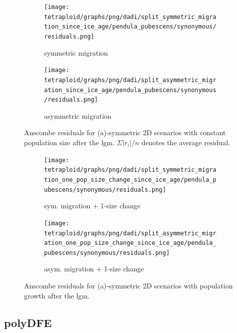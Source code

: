 \documentclass[hidelinks,11pt]{article}
\begin{document}
    \begin{figure}[H]
        \centering
        \begin{subfigure}[b]{0.49\textwidth}
            \texttt{[image: tetraploid/graphs/png/dadi/split\_symmetric\_migration\_since\_ice\_age/pendula\_pubescens/synonymous/residuals.png]}
            \caption{symmetric migration}
            \label{fig:constant_pop_size}
        \end{subfigure}
        \hfill
        \begin{subfigure}[b]{0.49\textwidth}
            \texttt{[image: tetraploid/graphs/png/dadi/split\_asymmetric\_migration\_since\_ice\_age/pendula\_pubescens/synonymous/residuals.png]}
            \caption{asymmetric migration}
            \label{fig:one_pop_size_change}
        \end{subfigure}
        \caption{Anscombe residuals for (a)-symmetric 2D scenarios with constant population size after the \acrshort{lgm}. $\Sigma |r_i|/n$ denotes the average residual.}
        \label{fig:dadi_2d_residuals_constant_size_fixed_time}
    \end{figure}

    \begin{figure}[H]
        \centering
        \begin{subfigure}[b]{0.49\textwidth}
            \texttt{[image: tetraploid/graphs/png/dadi/split\_symmetric\_migration\_one\_pop\_size\_change\_since\_ice\_age/pendula\_pubescens/synonymous/residuals.png]}
            \caption{sym. migration + 1-size change}
            \label{fig:two_pop_size_change_since_ice_age_sym}
        \end{subfigure}
        \hfill
        \begin{subfigure}[b]{0.49\textwidth}
            \texttt{[image: tetraploid/graphs/png/dadi/split\_asymmetric\_migration\_one\_pop\_size\_change\_since\_ice\_age/pendula\_pubescens/synonymous/residuals.png]}
            \caption{asym. migration + 1-size change}
            \label{fig:two_pop_size_change_since_ice_age_asym}
        \end{subfigure}
        \caption{Anscombe residuals for (a)-symmetric 2D scenarios with population growth after the \acrshort{lgm}.}
        \label{fig:dadi_2d_residuals_growth_fixed_time}
    \end{figure}

    \clearpage

    \subsection{polyDFE}
    \label{sec:appendix-polydfe}
\end{document}
